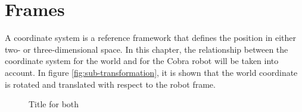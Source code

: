 \chapter{Frames}\label{ch:frames}
A coordinate system is a reference framework that defines the position in either two- or three-dimensional space. In this chapter, the relationship between the coordinate system for the world and for the Cobra robot will be taken into account. In figure \ref{fig:sub-transformation}, it is shown that the world coordinate is rotated and translated with respect to the robot frame. 

\begin{figure}[hb]
\hfill
{}
\hfill
{}
\hfill
\caption{Title for both}
\end{figure}

